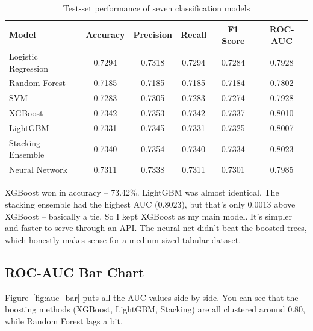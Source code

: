 \documentclass[12pt, a4paper, oneside]{book}
\begin{document}
\begin{table}[H]
\centering
{}
\renewcommand{\arraystretch}{1.1}
\caption{Test-set performance of seven classification models}
\label{tab:model_performance}
\small
\begin{tabular}{l S[table-format=1.4] S[table-format=1.4] S[table-format=1.4] S[table-format=1.4] S[table-format=1.4]}
\toprule
Model                  & {Accuracy} & {Precision} & {Recall} & {F1 Score} & {ROC-AUC} \\
\midrule
Logistic Regression    & 0.7294 & 0.7318 & 0.7294 & 0.7284 & 0.7928 \\
Random Forest          & 0.7185 & 0.7185 & 0.7185 & 0.7184 & 0.7802 \\
SVM                    & 0.7283 & 0.7305 & 0.7283 & 0.7274 & 0.7928 \\
XGBoost                & 0.7342 & 0.7353 & 0.7342 & 0.7337 & 0.8010 \\
LightGBM               & 0.7331 & 0.7345 & 0.7331 & 0.7325 & 0.8007 \\
Stacking Ensemble      & 0.7340 & 0.7354 & 0.7340 & 0.7334 & 0.8023 \\
Neural Network         & 0.7311 & 0.7338 & 0.7311 & 0.7301 & 0.7985 \\
\bottomrule
\end{tabular}
\end{table}

XGBoost won in accuracy – 73.42\%. LightGBM was almost identical. The stacking ensemble had the highest AUC (0.8023), but that's only 0.0013 above XGBoost – basically a tie. So I kept XGBoost as my main model. It's simpler and faster to serve through an API. The neural net didn't beat the boosted trees, which honestly makes sense for a medium-sized tabular dataset.

\subsection{ROC-AUC Bar Chart}
Figure~\ref{fig:auc_bar} puts all the AUC values side by side. You can see that the boosting methods (XGBoost, LightGBM, Stacking) are all clustered around 0.80, while Random Forest lags a bit.
\end{document}
